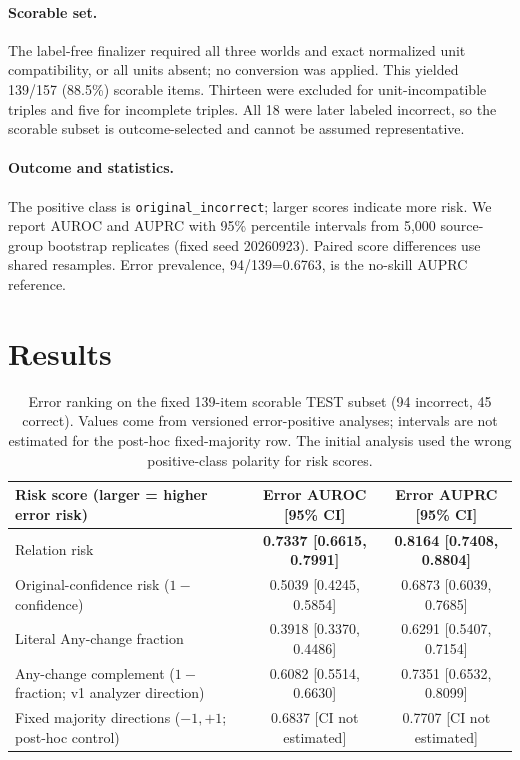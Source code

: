 \documentclass[11pt]{article}
\begin{document}
\paragraph{Scorable set.} The label-free finalizer required all three worlds and exact normalized unit compatibility, or all units absent; no conversion was applied. This yielded 139/157 (88.5\%) scorable items. Thirteen were excluded for unit-incompatible triples and five for incomplete triples. All 18 were later labeled incorrect, so the scorable subset is outcome-selected and cannot be assumed representative.
\paragraph{Outcome and statistics.} The positive class is \texttt{original\_incorrect}; larger scores indicate more risk. We report AUROC and AUPRC with 95\% percentile intervals from 5,000 source-group bootstrap replicates (fixed seed 20260923). Paired score differences use shared resamples. Error prevalence, 94/139=0.6763, is the no-skill AUPRC reference.

\section{Results}
\begin{table}[t]
\centering\small
\begin{tabularx}{\textwidth}{@{}Xcc@{}}
\toprule
Risk score (larger = higher error risk) & Error AUROC [95\% CI] & Error AUPRC [95\% CI] \\
\midrule
Relation risk & \textbf{0.7337 [0.6615, 0.7991]} & \textbf{0.8164 [0.7408, 0.8804]} \\
Original-confidence risk ($1-$confidence) & 0.5039 [0.4245, 0.5854] & 0.6873 [0.6039, 0.7685] \\
Literal Any-change fraction & 0.3918 [0.3370, 0.4486] & 0.6291 [0.5407, 0.7154] \\
Any-change complement ($1-$fraction; v1 analyzer direction) & 0.6082 [0.5514, 0.6630] & 0.7351 [0.6532, 0.8099] \\
Fixed majority directions ($-1,+1$; post-hoc control) & 0.6837 [CI not estimated] & 0.7707 [CI not estimated] \\
\bottomrule
\end{tabularx}
\caption{Error ranking on the fixed 139-item scorable TEST subset (94 incorrect, 45 correct). Values come from versioned error-positive analyses; intervals are not estimated for the post-hoc fixed-majority row. The initial analysis used the wrong positive-class polarity for risk scores.}
\label{tab:primary}
\end{table}
\end{document}
